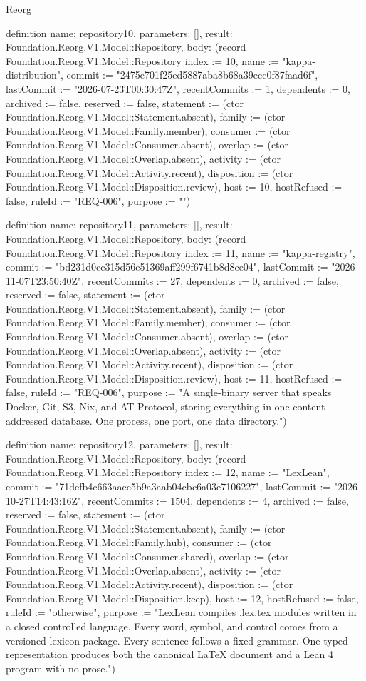 \begin{lexlean}{Reorg}
\begin{semanticmodule}
definition{
  name: repository10,
  parameters: [],
  result: Foundation.Reorg.V1.Model::Repository,
  body: (record Foundation.Reorg.V1.Model::Repository {index := 10, name := "kappa-distribution", commit := "2475e701f25ed5887aba8b68a39ecc0f87faad6f", lastCommit := "2026-07-23T00:30:47Z", recentCommits := 1, dependents := 0, archived := false, reserved := false, statement := (ctor Foundation.Reorg.V1.Model::Statement.absent), family := (ctor Foundation.Reorg.V1.Model::Family.member), consumer := (ctor Foundation.Reorg.V1.Model::Consumer.absent), overlap := (ctor Foundation.Reorg.V1.Model::Overlap.absent), activity := (ctor Foundation.Reorg.V1.Model::Activity.recent), disposition := (ctor Foundation.Reorg.V1.Model::Disposition.review), host := 10, hostRefused := false, ruleId := "REQ-006", purpose := ""})
}

definition{
  name: repository11,
  parameters: [],
  result: Foundation.Reorg.V1.Model::Repository,
  body: (record Foundation.Reorg.V1.Model::Repository {index := 11, name := "kappa-registry", commit := "bd231d0cc315d56e51369aff299f6741b8d8ce04", lastCommit := "2026-11-07T23:50:40Z", recentCommits := 27, dependents := 0, archived := false, reserved := false, statement := (ctor Foundation.Reorg.V1.Model::Statement.absent), family := (ctor Foundation.Reorg.V1.Model::Family.member), consumer := (ctor Foundation.Reorg.V1.Model::Consumer.absent), overlap := (ctor Foundation.Reorg.V1.Model::Overlap.absent), activity := (ctor Foundation.Reorg.V1.Model::Activity.recent), disposition := (ctor Foundation.Reorg.V1.Model::Disposition.review), host := 11, hostRefused := false, ruleId := "REQ-006", purpose := "A single-binary server that speaks Docker, Git, S3, Nix, and AT Protocol, storing everything in one content-addressed database. One process, one port, one data directory."})
}

definition{
  name: repository12,
  parameters: [],
  result: Foundation.Reorg.V1.Model::Repository,
  body: (record Foundation.Reorg.V1.Model::Repository {index := 12, name := "LexLean", commit := "71defb4c663aaec5b9a3aab04cbc6a03e7106227", lastCommit := "2026-10-27T14:43:16Z", recentCommits := 1504, dependents := 4, archived := false, reserved := false, statement := (ctor Foundation.Reorg.V1.Model::Statement.absent), family := (ctor Foundation.Reorg.V1.Model::Family.hub), consumer := (ctor Foundation.Reorg.V1.Model::Consumer.shared), overlap := (ctor Foundation.Reorg.V1.Model::Overlap.absent), activity := (ctor Foundation.Reorg.V1.Model::Activity.recent), disposition := (ctor Foundation.Reorg.V1.Model::Disposition.keep), host := 12, hostRefused := false, ruleId := "otherwise", purpose := "LexLean compiles .lex.tex modules written in a closed controlled language. Every word, symbol, and control comes from a versioned lexicon package. Every sentence follows a fixed grammar. One typed representation produces both the canonical LaTeX document and a Lean 4 program with no prose."})
}


\end{semanticmodule}
\end{lexlean}
